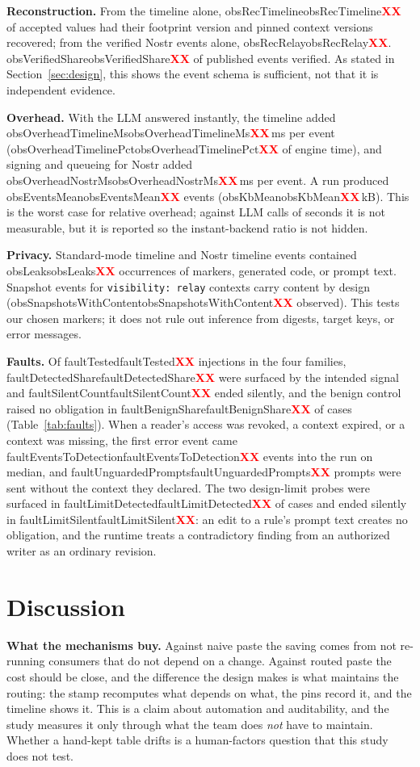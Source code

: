 \documentclass[10pt,conference]{IEEEtran}
\theoremstyle{definition}
\newcommand{\code}[1]{\texttt{#1}}
\newcommand{\R}[1]{\ifcsname #1\endcsname\csname #1\endcsname\else\textcolor{red}{\textbf{XX}}\fi}
\begin{document}
\textbf{Reconstruction.} From the timeline alone, \R{obsRecTimeline} of accepted values had their footprint
version and pinned context versions recovered; from the verified Nostr events alone, \R{obsRecRelay}.
\R{obsVerifiedShare} of published events verified. As stated in Section~\ref{sec:design}, this shows the event
schema is sufficient, not that it is independent evidence.

\textbf{Overhead.} With the LLM answered instantly, the timeline added \R{obsOverheadTimelineMs}\,ms per
event (\R{obsOverheadTimelinePct} of engine time), and signing and queueing for Nostr added
\R{obsOverheadNostrMs}\,ms per event. A run produced \R{obsEventsMean} events (\R{obsKbMean}\,kB). This is the
worst case for relative overhead; against LLM calls of seconds it is not measurable, but it is reported so the
instant-backend ratio is not hidden.

\textbf{Privacy.} Standard-mode timeline and Nostr timeline events contained \R{obsLeaks} occurrences of
markers, generated code, or prompt text. Snapshot events for \code{visibility: relay} contexts carry content by
design (\R{obsSnapshotsWithContent} observed). This tests our chosen markers; it does not rule out
inference from digests, target keys, or error messages.

\textbf{Faults.} Of \R{faultTested} injections in the four families, \R{faultDetectedShare} were surfaced by the
intended signal and \R{faultSilentCount} ended silently, and the benign control raised no obligation in
\R{faultBenignShare} of cases (Table~\ref{tab:faults}). When a reader's access was revoked, a context expired,
or a context was missing, the first error event came \R{faultEventsToDetection} events into the run on median,
and \R{faultUnguardedPrompts} prompts were sent without the context they declared. The two design-limit
probes were surfaced in \R{faultLimitDetected} of cases and ended silently in \R{faultLimitSilent}: an edit to a
rule's prompt text creates no obligation, and the runtime treats a contradictory finding from an authorized
writer as an ordinary revision.

\section{Discussion}\label{sec:discussion}

\textbf{What the mechanisms buy.} Against naive paste the saving comes from not re-running consumers that
do not depend on a change. Against routed paste the cost should be close, and the difference the design makes
is what maintains the routing: the stamp recomputes what depends on what, the pins record it, and the
timeline shows it. This is a claim about automation and auditability, and the study measures it only through
what the team does \emph{not} have to maintain. Whether a hand-kept table drifts is a human-factors question
that this study does not test.
\end{document}
